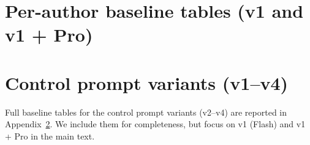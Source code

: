 \documentclass{article}
\begin{document}
\clearpage


\appendix
\section{Per-author baseline tables (v1 and v1 + Pro)}
\label{app:baseline_details}



\section{Control prompt variants (v1--v4)}
\label{app:controls}

Full baseline tables for the control prompt variants (v2--v4) are reported in Appendix~\ref{app:controls}. We include them for completeness, but focus on v1 (Flash) and v1 + Pro in the main text.




\end{document}
